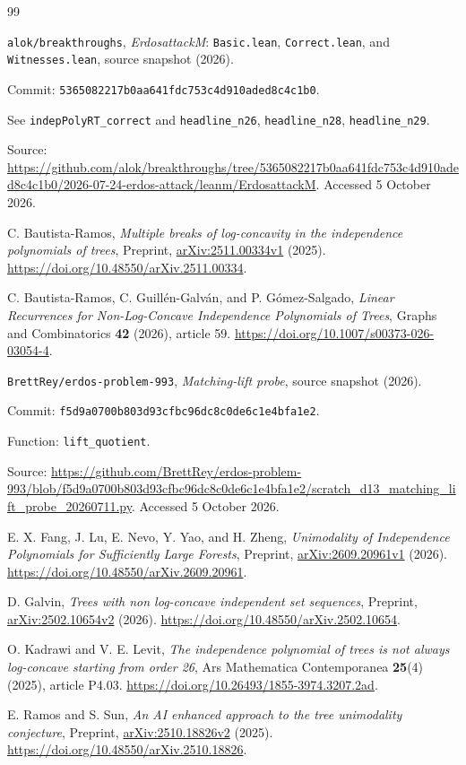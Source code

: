 \documentclass[11pt,a4paper]{article}
\theoremstyle{remark}
\numberwithin{equation}{section}
\begin{document}
\begin{thebibliography}{99}

\nolinkurl{alok/breakthroughs},
\emph{ErdosattackM}: \nolinkurl{Basic.lean}, \nolinkurl{Correct.lean},
and \nolinkurl{Witnesses.lean}, source snapshot (2026).
\par Commit: \nolinkurl{5365082217b0aa641fdc753c4d910aded8c4c1b0}.
\par See \nolinkurl{indepPolyRT_correct} and
\nolinkurl{headline_n26}, \nolinkurl{headline_n28}, \nolinkurl{headline_n29}.
\par Source: \url{https://github.com/alok/breakthroughs/tree/5365082217b0aa641fdc753c4d910aded8c4c1b0/2026-07-24-erdos-attack/leanm/ErdosattackM}.
Accessed 5 October 2026.

C. Bautista-Ramos,
\emph{Multiple breaks of log-concavity in the independence polynomials of trees},
Preprint, \href{https://arxiv.org/abs/2511.00334v1}{arXiv:2511.00334v1} (2025).
\url{https://doi.org/10.48550/arXiv.2511.00334}.

C. Bautista-Ramos, C. Guill\'en-Galv\'an, and P. G\'omez-Salgado,
\emph{Linear Recurrences for Non-Log-Concave Independence Polynomials
of Trees}, Graphs and Combinatorics \textbf{42} (2026), article 59.
\url{https://doi.org/10.1007/s00373-026-03054-4}.

\nolinkurl{BrettRey/erdos-problem-993},
\emph{Matching-lift probe}, source snapshot (2026).
\par Commit: \nolinkurl{f5d9a0700b803d93cfbc96dc8c0de6c1e4bfa1e2}.
\par Function: \nolinkurl{lift_quotient}.
\par Source: \url{https://github.com/BrettRey/erdos-problem-993/blob/f5d9a0700b803d93cfbc96dc8c0de6c1e4bfa1e2/scratch_d13_matching_lift_probe_20260711.py}.
Accessed 5 October 2026.

E. X. Fang, J. Lu, E. Nevo, Y. Yao, and H. Zheng,
\emph{Unimodality of Independence Polynomials for Sufficiently Large Forests},
Preprint, \href{https://arxiv.org/abs/2609.20961v1}{arXiv:2609.20961v1} (2026).
\url{https://doi.org/10.48550/arXiv.2609.20961}.

D. Galvin,
\emph{Trees with non log-concave independent set sequences},
Preprint, \href{https://arxiv.org/abs/2502.10654v2}{arXiv:2502.10654v2} (2026).
\url{https://doi.org/10.48550/arXiv.2502.10654}.

O. Kadrawi and V. E. Levit,
\emph{The independence polynomial of trees is not always log-concave
starting from order 26}, Ars Mathematica Contemporanea \textbf{25}(4)
(2025), article P4.03.
\url{https://doi.org/10.26493/1855-3974.3207.2ad}.

E. Ramos and S. Sun,
\emph{An AI enhanced approach to the tree unimodality conjecture},
Preprint, \href{https://arxiv.org/abs/2510.18826v2}{arXiv:2510.18826v2} (2025).
\url{https://doi.org/10.48550/arXiv.2510.18826}.

\end{thebibliography}
\end{document}

